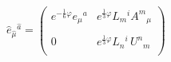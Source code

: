 \begin{equation}
  \hat{e}_{\hat{\mu}}{}^{\hat{a}}   = 
\left(
\begin{array}{cr}
e^{-\frac{1}{6}\varphi} e_{\mu}{}^{a} & 
e^{\frac{1}{3}\varphi} L_{m}{}^{i}A^{m}{}_{\mu} \\
&\\
0             & 
e^{\frac{1}{3}\varphi}L_{n}{}^{i}\,U^{n}{}_{m}   \\
\end{array}
\right) \, 
\end{equation}

